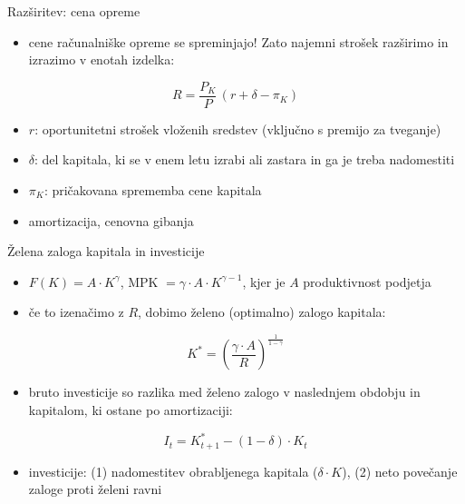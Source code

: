 \documentclass[aspectratio=169,11pt]{beamer}
\begin{document}
\begin{frame}{Razširitev: cena opreme}
\begin{itemize}
\item cene računalniške opreme se spreminjajo! Zato najemni strošek razširimo in izrazimo v enotah izdelka:
\end{itemize}
\[
\boxed{R = \frac{P_K}{P}\,(r + \delta - \pi_K)}
\]
\begin{itemize}
\item $r$: oportunitetni strošek vloženih sredstev (vključno s premijo za tveganje)
\item $\delta$: del kapitala, ki se v enem letu izrabi ali zastara in ga je treba nadomestiti
\item $\pi_K$: pričakovana sprememba cene kapitala
\item amortizacija, cenovna gibanja
\end{itemize}
\end{frame}

\begin{frame}{Želena zaloga kapitala in investicije}
\begin{itemize}
\item $F(K) = A\cdot K^{\gamma}$, MPK $= \gamma\cdot A\cdot K^{\gamma-1}$, kjer je $A$ produktivnost podjetja
\item če to izenačimo z $R$, dobimo želeno (optimalno) zalogo kapitala:
\end{itemize}
\[
\boxed{K^{*} = \left(\frac{\gamma\cdot A}{R}\right)^{\frac{1}{1-\gamma}}}
\]
\begin{itemize}
\item bruto investicije so razlika med želeno zalogo v naslednjem obdobju in kapitalom, ki ostane po amortizaciji:
\end{itemize}
\[
\boxed{I_t = K^{*}_{t+1} - (1-\delta)\cdot K_t}
\]
\begin{itemize}
\item investicije: (1) nadomestitev obrabljenega kapitala ($\delta\cdot K$), (2) neto povečanje zaloge proti želeni ravni
\end{itemize}
\end{frame}
\end{document}
